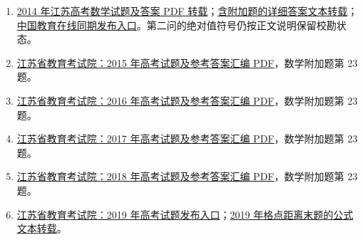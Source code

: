 \documentclass[UTF8]{ctexart}
\begin{document}
\begin{enumerate}
\item\label{src:g2014} \href{https://mat1.gtimg.com/edu/PDF/jsws.pdf}{2014 年江苏高考数学试题及答案 PDF 转载}；\href{https://www.renrendoc.com/paper/207419020.html}{含附加题的详细答案文本转载}；\href{https://gaokao.eol.cn/shiti/zhenti/201406/t20140607_1127957.shtml}{中国教育在线同期发布入口}。第二问的绝对值符号仍按正文说明保留校勘状态。
\item\label{src:g2015} \href{https://www.jseea.cn/webfile/upload/old/contents/channel_6/2015/06/1506101049510.pdf}{江苏省教育考试院：2015 年高考试题及参考答案汇编 PDF}，数学附加题第 23 题。
\item\label{src:g2016} \href{https://www.jseea.cn/webfile/upload/old/contents/channel_173/2016/06/1606100927946.pdf}{江苏省教育考试院：2016 年高考试题及参考答案汇编 PDF}，数学附加题第 23 题。
\item\label{src:g2017} \href{https://www.jseea.cn/webfile/upload/old/contents/channel_1/2017/06/1706092140912.pdf}{江苏省教育考试院：2017 年高考试题及参考答案汇编 PDF}，数学附加题第 23 题。
\item\label{src:g2018} \href{https://www.jseea.cn/webfile/upload/old/contents/channel_173/2018/06/1806100757613.pdf}{江苏省教育考试院：2018 年高考试题及参考答案汇编 PDF}，数学附加题第 23 题。
\item\label{src:g2019} \href{https://www.jseea.cn/webfile/highschool_ptgk_data/2019-06-10/6514.html}{江苏省教育考试院：2019 年高考试题发布入口}；\href{https://gaokaohub.com/q/item/102459044642881.html}{2019 年格点距离末题的公式文本转载}。
\end{enumerate}
\end{document}
